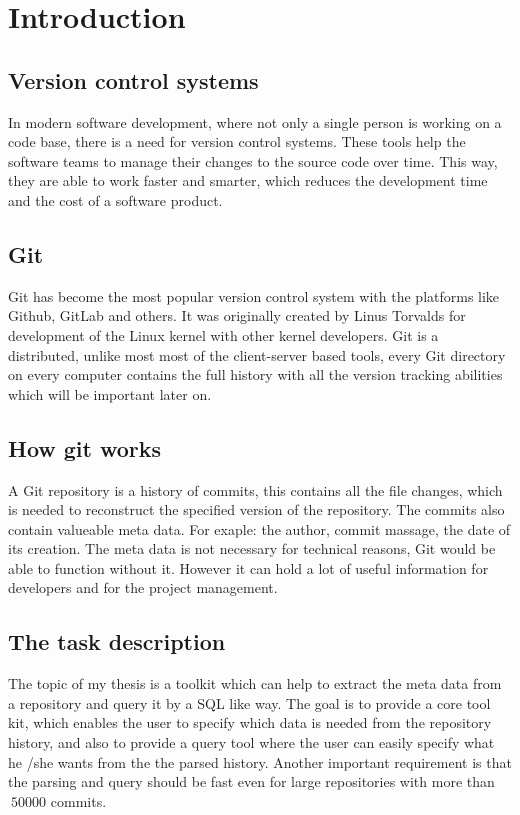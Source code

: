 \chapter{Introduction}
\label{ch:intro}

\section{Version control systems}
In modern software development, where not only a single person is working on a code base, there is a need for version control systems. 
These tools help the software teams to manage their changes to the source code over time. 
This way, they are able to work faster and smarter, which reduces the development time and the cost of a software product.

\section{Git}
Git has become the most popular version control system with the platforms like Github\cite{github}, GitLab\cite{gitlab} and others. 
It was originally created by Linus Torvalds \cite{linus} for development of the Linux kernel with other kernel developers. 
Git is a distributed, unlike most most of the client-server based tools, every Git directory on every computer contains the full history with all the version tracking abilities which will be important later on.

\section{How git works}
A Git repository is a history of commits, this contains all the file changes, which is needed to reconstruct the specified version of the repository. 
The commits also contain valueable meta data. For exaple: the author, commit massage, the date of its creation.
The meta data is not necessary for technical reasons, Git would be able to function without it. 
However it can hold a lot of useful information for developers and for the project management.

\section{The task description}
The topic of my thesis is a toolkit which can help to extract the meta data from a repository and query it by a SQL like way. 
The goal is to provide a core tool kit, which enables the user to specify which data is needed from the repository history, and also  to provide a query tool where the user can easily specify what he /she wants from the the parsed history. 
Another important requirement is that the parsing and query should be fast even for large repositories with more than \(~50000\) commits.

